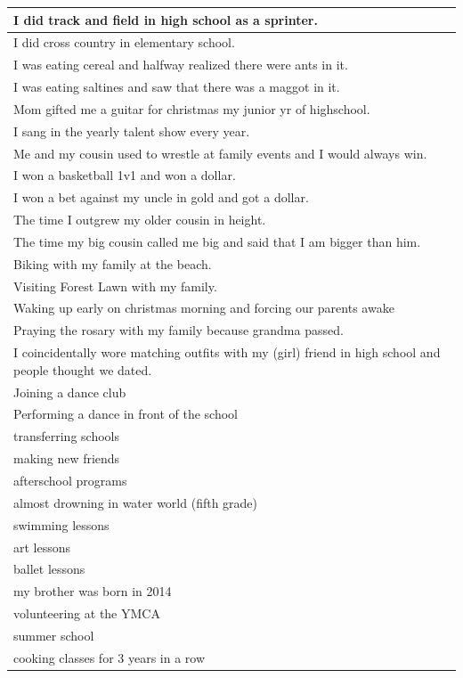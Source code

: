 \documentclass[
  .7em,
  letterpaper,
  DIV=11,
  numbers=noendperiod]{scrartcl}
\begin{document}
\begin{table}
\begin{tabular}{l}
\hline
I did track and field in high school as a sprinter.\\
\hline
I did cross country in elementary school.\\
\hline
I was eating cereal and halfway realized there were ants in it.\\
\hline
I was eating saltines and saw that there was a maggot in it.\\
\hline
Mom gifted me a guitar for christmas my junior yr of highschool.\\
\hline
I sang in the yearly talent show every year.\\
\hline
Me and my cousin used to wrestle at family events and I would always win.\\
\hline
I won a basketball 1v1 and won a dollar.\\
\hline
I won a bet against my uncle in gold and got a dollar.\\
\hline
The time I outgrew my older cousin in height.\\
\hline
The time my big cousin called me big and said that I am bigger than him.\\
\hline
Biking with my family at the beach.\\
\hline
Visiting Forest Lawn with my family.\\
\hline
Waking up early on christmas morning and forcing our parents awake\\
\hline
Praying the rosary with my family because grandma passed.\\
\hline
I coincidentally wore matching outfits with my (girl) friend in high school and people thought we dated.\\
\hline
Joining a dance club\\
\hline
Performing a dance in front of the school\\
\hline
transferring schools\\
\hline
making new friends\\
\hline
afterschool programs\\
\hline
almost drowning in water world (fifth grade)\\
\hline
swimming lessons\\
\hline
art lessons\\
\hline
ballet lessons\\
\hline
my brother was born in 2014\\
\hline
volunteering at the YMCA\\
\hline
summer school\\
\hline
cooking classes for 3 years in a row\\

\end{tabular}
\end{table}
\end{document}
